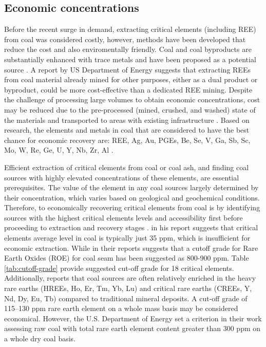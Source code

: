 \documentclass[11pt,a4paper,]{article}
\begin{document}
\subsection{Economic concentrations}\label{economic-concentrations}

Before the recent surge in demand, extracting critical elements (including REE) from coal was considered costly, however, methods have been developed that reduce the cost and also enviromentally friendly. Coal and coal byproducts are substantially enhanced with trace metals and have been proposed as a potential source \autocite{Eterigho2021}. A report by US Department of Energy suggests that extracting REEs from coal material already mined for other purposes, either as a dual product or byproduct, could be more cost-effective than a dedicated REE mining. Despite the challenge of processing large volumes to obtain economic concentrations, cost may be reduced due to the pre-processed (mined, crushed, and washed) state of the materials and transported to areas with existing infrastructure \autocite{usde2017,Hodgkinson2021}. Based on research, the elements and metals in coal that are considered to have the best chance for economic recovery are: REE, Ag, Au, PGEs, Be, Se, V, Ga, Sb, Sc, Mo, W, Re, Ge, U, Y, Nb, Zr, Al \autocite{DAI2018155}.

Efficient extraction of critical elements from coal or coal ash, and finding coal sources with highly elevated concentrations of these elements, are essential prerequisites. The value of the element in any coal sources largely determined by their concentration, which varies based on geological and geochemical conditions. Therefore, to economically recovering critical elements from coal is by identifying sources with the highest critical elements levels and accessibility first before proceeding to extraction and recovery stages \autocite{Eterigho2021}. \textcite{Reid2018} in his report suggests that critical elements average level in coal is typically just 35 ppm, which is insufficient for economic extraction. While \textcite{Seredin2012} in their reports suggests that a cutoff grade for Rare Earth Oxides (ROE) for coal seam has been suggested as 800-900 ppm. Table \ref{tab:cutoff-grade} provide suggested cut-off grade for 18 critical elements. Additionally, \textcite{TALAN2022107897} reports that coal sources are often relatively enriched in the heavy rare earths (HREEs, Ho, Er, Tm, Yb, Lu) and critical rare earths (CREEs, Y, Nd, Dy, Eu, Tb) compared to traditional mineral deposits. A cut-off grade of 115--130 ppm rare earth element on a whole mass basis may be considered economical. However, the U.S. Department of Energy set a criterion in their work assessing raw coal with total rare earth element content greater than 300 ppm on a whole dry coal basis.
\end{document}
